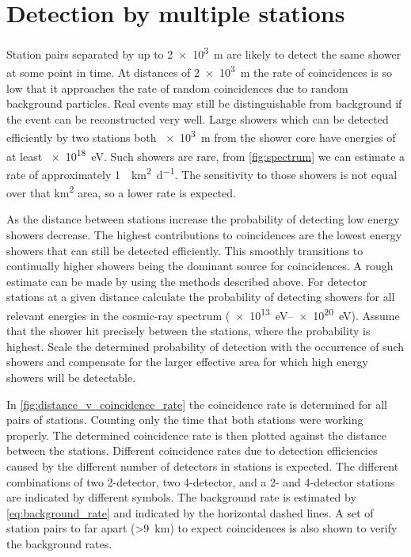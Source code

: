 \section{Detection by multiple stations}

Station pairs separated by up to \SI{2e3}{\meter} are likely to detect the same shower at some point in time. At distances of \SI{2e3}{\meter} the rate of coincidences is so low that it approaches the rate of random coincidences due to random background particles. Real events may still be distinguishable from background if the event can be reconstructed very well. Large showers which can be detected efficiently by two stations both \SI{e3}{\meter} from the shower core have energies of at least \SI{e18}{\eV}. Such showers are rare, from \cref{fig:spectrum} we can estimate a rate of approximately \SI{1}{\per\kilo\meter\squared\per\day}. The sensitivity to those showers is not equal over that \si{\kilo\meter\squared} area, so a lower rate is expected.

As the distance between stations increase the probability of detecting low energy showers decrease. The highest contributions to coincidences are the lowest energy showers that can still be detected efficiently. This smoothly transitions to continually higher showers being the dominant source for coincidences. A rough estimate can be made by using the methods described above. For detector stations at a given distance calculate the probability of detecting showers for all relevant energies in the cosmic-ray spectrum (\SIrange{e13}{e20}{\eV}). Assume that the shower hit precisely between the stations, where the probability is highest. Scale the determined probability of detection with the occurrence of such showers and compensate for the larger effective area for which high energy showers will be detectable.

In \cref{fig:distance_v_coincidence_rate} the coincidence rate is determined for all pairs of stations. Counting only the time that both stations were working properly. The determined coincidence rate is then plotted against the distance between the stations. Different coincidence rates due to detection efficiencies caused by the different number of detectors in stations is expected. The different combinations of two 2-detector, two 4-detector, and a 2- and 4-detector stations are indicated by different symbols. The background rate is estimated by \cref{eq:background_rate} and indicated by the horizontal dashed lines. A set of station pairs to far apart (\SI{>9}{\kilo\meter}) to expect coincidences is also shown to verify the background rates.

